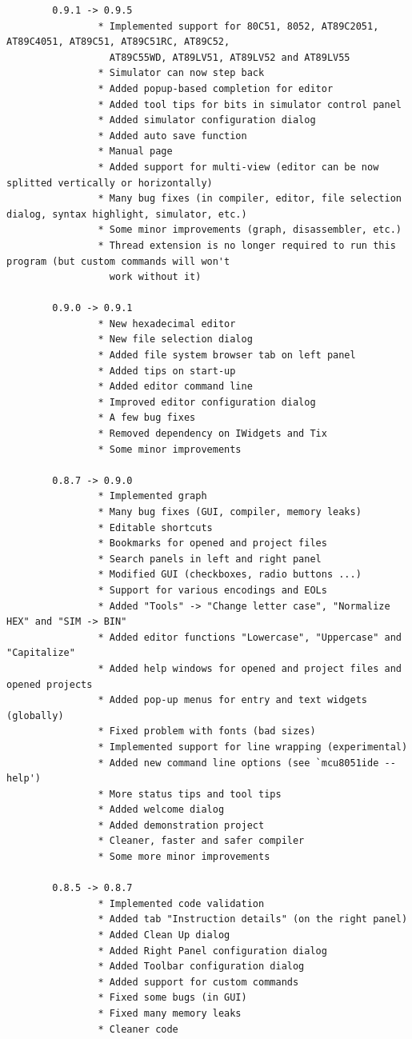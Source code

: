\documentclass[a4paper,twoside,12pt]{book}
\begin{document}
{\begin{verbatim}
		0.9.1 -> 0.9.5
		        * Implemented support for 80C51, 8052, AT89C2051, AT89C4051, AT89C51, AT89C51RC, AT89C52,
		          AT89C55WD, AT89LV51, AT89LV52 and AT89LV55
		        * Simulator can now step back
		        * Added popup-based completion for editor
		        * Added tool tips for bits in simulator control panel
		        * Added simulator configuration dialog
		        * Added auto save function
		        * Manual page
		        * Added support for multi-view (editor can be now splitted vertically or horizontally)
		        * Many bug fixes (in compiler, editor, file selection dialog, syntax highlight, simulator, etc.)
		        * Some minor improvements (graph, disassembler, etc.)
		        * Thread extension is no longer required to run this program (but custom commands will won't
		          work without it)

		0.9.0 -> 0.9.1
		        * New hexadecimal editor
		        * New file selection dialog
		        * Added file system browser tab on left panel
		        * Added tips on start-up
		        * Added editor command line
		        * Improved editor configuration dialog
		        * A few bug fixes
		        * Removed dependency on IWidgets and Tix
		        * Some minor improvements

		0.8.7 -> 0.9.0
		        * Implemented graph
		        * Many bug fixes (GUI, compiler, memory leaks)
		        * Editable shortcuts
		        * Bookmarks for opened and project files
		        * Search panels in left and right panel
		        * Modified GUI (checkboxes, radio buttons ...)
		        * Support for various encodings and EOLs
		        * Added "Tools" -> "Change letter case", "Normalize HEX" and "SIM -> BIN"
		        * Added editor functions "Lowercase", "Uppercase" and "Capitalize"
		        * Added help windows for opened and project files and opened projects
		        * Added pop-up menus for entry and text widgets (globally)
		        * Fixed problem with fonts (bad sizes)
		        * Implemented support for line wrapping (experimental)
		        * Added new command line options (see `mcu8051ide --help')
		        * More status tips and tool tips
		        * Added welcome dialog
		        * Added demonstration project
		        * Cleaner, faster and safer compiler
		        * Some more minor improvements

		0.8.5 -> 0.8.7
		        * Implemented code validation
		        * Added tab "Instruction details" (on the right panel)
		        * Added Clean Up dialog
		        * Added Right Panel configuration dialog
		        * Added Toolbar configuration dialog
		        * Added support for custom commands
		        * Fixed some bugs (in GUI)
		        * Fixed many memory leaks
		        * Cleaner code


\end{verbatim}}
\end{document}
